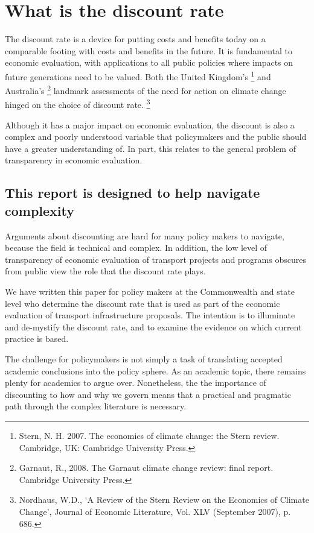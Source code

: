 \chapter{What is the discount rate}\label{chap:what-is-the-discount-rate}

The discount rate is a device for putting costs and benefits today on a comparable footing with costs and benefits in the future. It is fundamental to economic evaluation, with applications to all public policies where impacts on future generations need to be valued. Both the United Kingdom’s%
    \footnote{Stern, N. H. 2007. The economics of climate change: the Stern review. Cambridge, UK: Cambridge University Press.}
and Australia’s%
    \footnote{Garnaut, R., 2008. The Garnaut climate change review: final report. Cambridge University Press.}  
landmark assessments of the need for action on climate change hinged on the choice of discount rate.%
    \footnote{Nordhaus, W.D., ‘A Review of the Stern Review on the Economics of Climate Change’, Journal of Economic Literature, Vol. XLV (September 2007), p. 686.} 

Although it has a major impact on economic evaluation, the discount is also a complex and poorly understood variable that policymakers and the public should have a greater understanding of. In part, this relates to the general problem of transparency in economic evaluation. 


\section{This report is designed to help navigate complexity}

Arguments about discounting are hard for many policy makers to navigate, because the field is technical and complex. In addition, the low level of transparency of economic evaluation of transport projects and programs obscures from public view the role that the discount rate plays. 

We have written this paper for policy makers at the Commonwealth and state level who determine the discount rate that is used as part of the economic evaluation of transport infrastructure proposals. The intention is to illuminate and de-mystify the discount rate, and to examine the evidence on which current practice is based.

The challenge for policymakers is not simply a task of translating accepted academic conclusions into the policy sphere. As an academic topic, there remains plenty for academics to argue over. Nonetheless, the the importance of discounting to how and why we govern means that a practical and pragmatic path through the complex literature is necessary.

